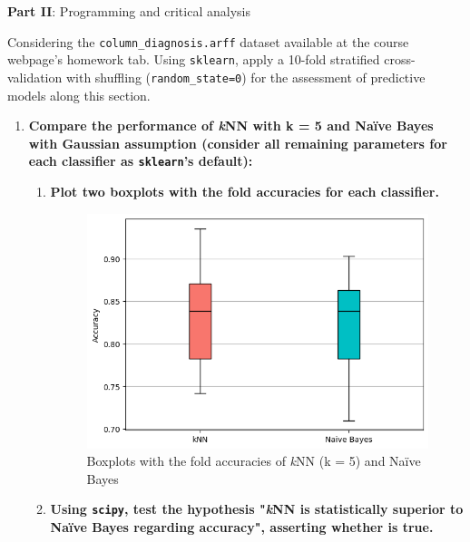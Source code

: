 \documentclass[12pt]{article}
\begin{document}
\vskip 0.5cm

\begin{center}
\large{\textbf{Part II}: Programming and critical analysis}\normalsize
\end{center}

\noindent Considering the \texttt{column\_diagnosis.arff} dataset available at the course webpage’s homework tab. Using \texttt{sklearn}, apply a 10-fold stratified
cross-validation with shuffling (\texttt{random\_state=0}) for the assessment of predictive models along this section.

\begin{enumerate}[leftmargin=\labelsep]
    \item \textbf{Compare the performance of \textit{k}NN with k = 5 and Naïve Bayes with Gaussian assumption
          (consider all remaining parameters for each classifier as \texttt{sklearn}'s default):}
          \begin{enumerate}
          \item \textbf{Plot two boxplots with the fold accuracies for each classifier.}

          \vskip 0.3cm
          

          \begin{figure}[H]
            \centering
            \includegraphics[width=13cm]{./assets/boxplot_ex1_PartII.png}
            \caption{Boxplots with the fold accuracies of \textit{k}NN (k = 5) and Naïve Bayes}
            \label{fig:PartII-ex1a}
          \end{figure}

          \item \textbf{Using \texttt{scipy}, test the hypothesis "\textit{k}NN is statistically superior to Naïve Bayes regarding
                accuracy", asserting whether is true.}


\end{enumerate}
\end{enumerate}
\end{document}
